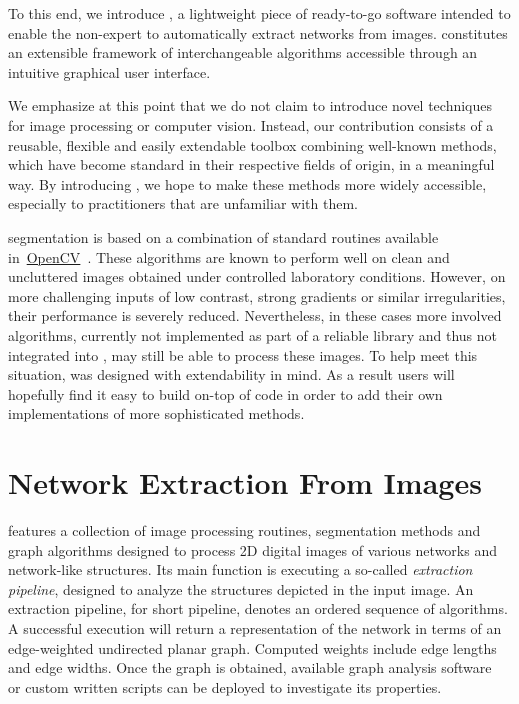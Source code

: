 	To this end, we introduce \NEFI, a lightweight piece of ready-to-go software intended to enable the non-expert to automatically extract networks from images. \NEFI constitutes an extensible framework of interchangeable algorithms accessible through an intuitive graphical user interface. 

	We emphasize at this point that we do not claim to introduce novel techniques for image processing or computer vision. Instead, our contribution consists of a reusable, flexible and easily extendable toolbox combining well-known methods, which have become standard in their respective fields of origin, in a meaningful way. By introducing \NEFI, we hope to make these methods more widely accessible, especially to practitioners that are unfamiliar with them.

	\NEFIs segmentation is based on a combination of standard routines available in~\href{http://opencv.org/}{OpenCV}~\cite{opencv}. These algorithms are known to perform well on clean and uncluttered images obtained under controlled laboratory conditions. However, on more challenging inputs of low contrast, strong gradients or similar irregularities, their performance is severely reduced. Nevertheless, in these cases more involved algorithms, currently not implemented as part of a reliable library and thus not integrated into \NEFI, may still be able to process these images. To help meet this situation, \NEFI was designed with extendability in mind. As a result users will hopefully find it easy to build on-top of \NEFIs code in order to add their own implementations of more sophisticated methods. 

\section{Network Extraction From Images}	%

	\NEFI features a collection of image processing routines, segmentation methods and graph algorithms designed to process 2D digital images of various networks and network-like structures. Its main function is executing a so-called \emph{extraction pipeline}, designed to analyze the structures depicted in the input image. An extraction pipeline, for short pipeline, denotes an ordered sequence of algorithms. A successful execution will return a representation of the network in terms of an edge-weighted undirected planar graph. Computed weights include edge lengths and edge widths. Once the graph is obtained, available graph analysis software~\cite{ICWSM09154,snap,batagelj1998pajek,5437689,loscalzo2008social,networkx} or custom written scripts can be deployed to investigate its properties.

